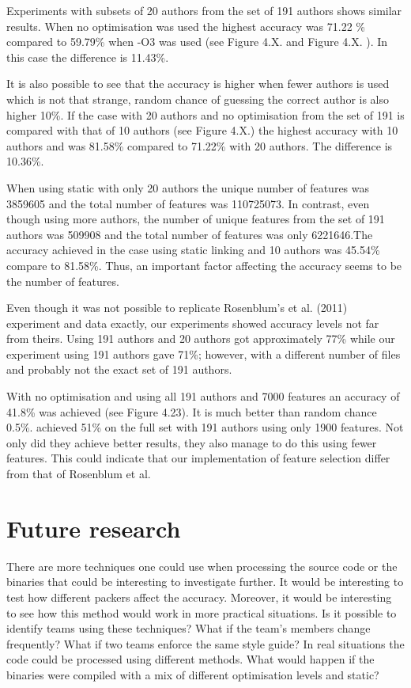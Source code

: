 \documentclass[a4paper,11pt]{kth-mag}
\begin{document}
Experiments with subsets of 20 authors from the set of 191 authors shows
similar results. When no optimisation was used the highest accuracy was 71.22
\% compared to 59.79\% when -O3 was used (see Figure 4.X. and  Figure 4.X. ).
In this case the difference is 11.43\%.

It is also possible to see that the accuracy is higher when fewer authors is
used which is not that strange, random chance of guessing the correct author is
also higher 10\%. If the case with 20 authors and no optimisation from the set
of 191 is compared with that of 10 authors (see Figure 4.X.) the highest
accuracy with 10 authors and was 81.58\% compared to 71.22\% with 20 authors.
The difference is 10.36\%.

When using static with only 20 authors the unique number of features was
3859605 and the total number of features was 110725073. In contrast, even
though using more authors,  the number of unique features from the set of 191
authors was 509908 and the total number of features was only 6221646.The
accuracy achieved in the case using static linking and 10 authors was 45.54\%
compare to 81.58\%. Thus, an important factor affecting the accuracy seems to
be the number of features. 

Even though it was not possible to replicate Rosenblum’s et al. (2011) experiment and data
exactly, our experiments showed accuracy levels not far from theirs. Using 191
authors and 20 authors \parencite{rosenblum2011wrote} got approximately 77\% while
our experiment using 191 authors gave 71\%; however, with a different number of files and
probably not the exact set of 191 authors.     

With no optimisation and using all 191 authors and 7000 features an accuracy of
41.8\% was achieved (see Figure 4.23). It is much better than random chance
0.5\%. \parencite{rosenblum2011wrote} achieved 51\% on the full set with 191
authors using only 1900 features. Not only did they achieve better results,
they also manage to do this using fewer features. This could indicate that our
implementation of feature selection differ from that of Rosenblum et al.

\section{Future research}
There are more techniques one could use when processing the source code or the
binaries that could be interesting to investigate further. It would be
interesting to test how different packers affect the accuracy. Moreover, it
would be interesting to see how this method would work in more practical
situations. Is it possible to identify teams using these techniques? What if
the team’s members change frequently? What if two teams enforce the same style
guide? In real situations the code could be processed using different methods.
What would happen if the binaries were compiled with a mix of different
optimisation levels and static?  
\end{document}
